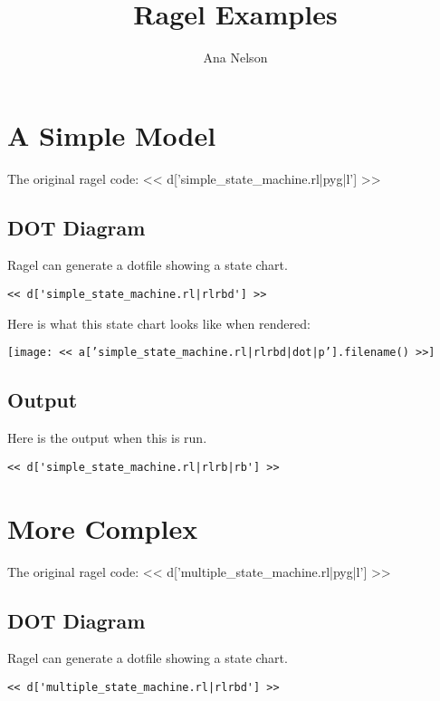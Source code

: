 \documentclass[a4paper]{article}
\title{Ragel Examples}
\author{Ana Nelson}
\begin{document}
\maketitle

\tableofcontents

\section{A Simple Model}

The original ragel code:
<< d['simple_state_machine.rl|pyg|l'] >>

\subsection{DOT Diagram}

Ragel can generate a dotfile showing a state chart.

\begin{Verbatim}
<< d['simple_state_machine.rl|rlrbd'] >>
\end{Verbatim}

Here is what this state chart looks like when rendered:

\texttt{[image: << a['simple\_state\_machine.rl|rlrbd|dot|p'].filename() >>]}

\subsection{Output}

Here is the output when this is run.

\begin{Verbatim}
<< d['simple_state_machine.rl|rlrb|rb'] >>
\end{Verbatim}

\section{More Complex}

The original ragel code:
<< d['multiple_state_machine.rl|pyg|l'] >>

\subsection{DOT Diagram}

Ragel can generate a dotfile showing a state chart.

\begin{Verbatim}
<< d['multiple_state_machine.rl|rlrbd'] >>
\end{Verbatim}
\end{document}
